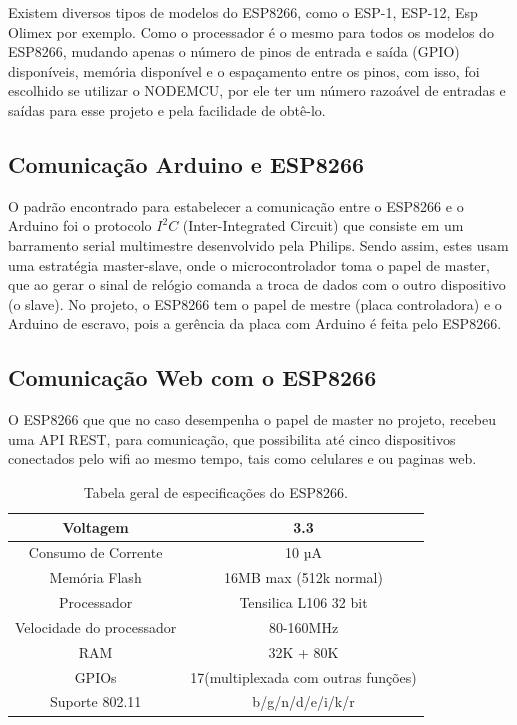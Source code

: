 \documentclass[conference]{IEEEtran}
\begin{document}
Existem diversos tipos de modelos do ESP8266, como o ESP-1, ESP-12, Esp Olimex por exemplo. Como o processador é o mesmo para todos os modelos do ESP8266, mudando apenas o número de pinos de entrada e saída (GPIO) disponíveis, memória disponível e o espaçamento entre os pinos, com isso, foi escolhido se utilizar o NODEMCU, por ele ter um número razoável de entradas e saídas para esse projeto e pela facilidade de obtê-lo.

\subsection{Comunicação Arduino e ESP8266}
O padrão encontrado para estabelecer a comunicação entre o ESP8266 e o Arduino foi o protocolo $I^2C$ (Inter-Integrated Circuit) que consiste em um barramento serial multimestre desenvolvido pela Philips. Sendo assim, estes usam uma estratégia master-slave, onde o microcontrolador toma o papel de master, que ao gerar o sinal de relógio comanda a troca de dados com o outro dispositivo (o slave).
No projeto, o ESP8266 tem o papel de mestre (placa controladora) e o Arduino de escravo, pois a gerência da placa com Arduino é feita pelo ESP8266.

\subsection{Comunicação Web com o ESP8266}
O ESP8266 que que no caso desempenha o papel de master no projeto, recebeu uma API REST, para comunicação, que possibilita até cinco dispositivos conectados pelo wifi ao mesmo tempo, tais como 
celulares e ou paginas web.


\begin{table}[htbp]
\caption{Tabela geral de especificações do ESP8266.}
\begin{center}
\begin{tabular}{|c|c|}
\hline
Voltagem & 3.3 \\
\hline
Consumo de Corrente & 10 µA \\
\hline
Memória Flash & 16MB max (512k normal) \\
\hline
Processador & Tensilica L106 32 bit \\
\hline
Velocidade do processador & 80-160MHz \\
\hline
RAM & 32K + 80K \\
\hline
GPIOs & 17(multiplexada com outras funções) \\
\hline
Suporte 802.11 & b/g/n/d/e/i/k/r \\
\hline
\end{tabular}
\label{tab1}
\end{center}
\end{table}
\end{document}
